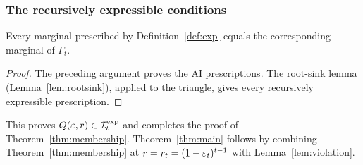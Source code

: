 \subsubsection{The recursively expressible conditions}
\begin{lemma}\label{lem:expressible}
Every marginal prescribed by Definition~\ref{def:exp} equals the corresponding marginal of $\Gamma_t$.
\end{lemma}
\begin{proof}
The preceding argument proves the AI prescriptions. The root-sink lemma (Lemma~\ref{lem:rootsink}), applied to the triangle, gives every recursively expressible prescription.
\end{proof}

This proves $Q(\varepsilon,r)\in\mathcal I^{\mathrm{exp}}_t$ and completes the proof of Theorem~\ref{thm:membership}. Theorem~\ref{thm:main} follows by combining Theorem~\ref{thm:membership} at $r=r_t=(1-\varepsilon_t)^{t-1}$ with Lemma~\ref{lem:violation}.
